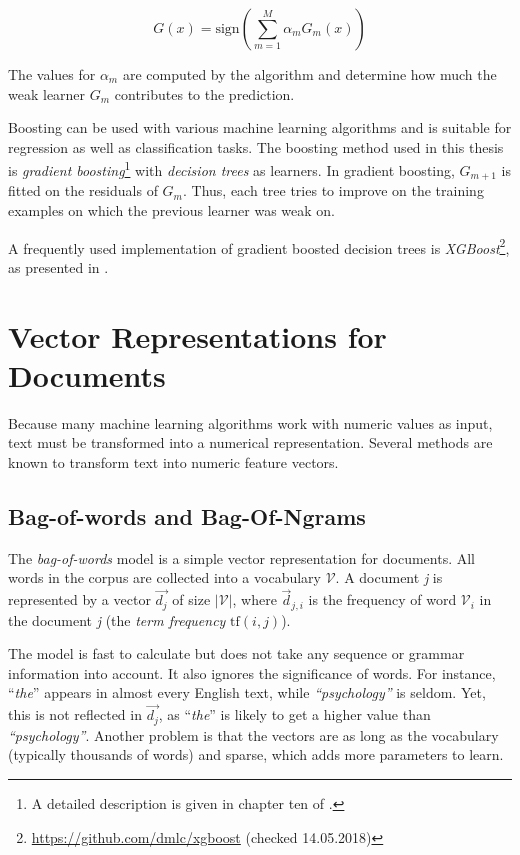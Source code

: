 \[G(x) = \text{sign}\left(\sum^M_{m=1} \alpha_m G_m(x)\right) \]

The values for $\alpha_m$ are computed by the algorithm and determine how much the weak learner \emph{$G_m$} contributes to the prediction.

Boosting can be used with various machine learning algorithms and is suitable for regression as well as classification tasks. The boosting method used in this thesis is \emph{gradient boosting}\footnote{A detailed description is given in chapter ten of \cite{friedman2001elements}.} with \emph{decision trees} as learners. In gradient boosting, \emph{$G_{m+1}$} is fitted on the residuals of \emph{$G_m$}. Thus, each tree tries to improve on the training examples on which the previous learner was weak on.

A frequently used implementation of gradient boosted decision trees is \emph{XGBoost}\footnote{\url{https://github.com/dmlc/xgboost} (checked 14.05.2018)}, as presented in \cite{DBLP:journals/corr/ChenG16}.



\section{Vector Representations for Documents}
Because many machine learning algorithms work with numeric values as input, text must be transformed into a numerical representation. Several methods are known to transform text into numeric feature vectors.
\subsection{Bag-of-words and Bag-Of-Ngrams}
The \emph{bag-of-words} model is a simple vector representation for documents. All words in the corpus are collected into a vocabulary $\mathcal{V}$. A document  \emph{j} is represented by a vector $\vec{d_j}$ of size $|\mathcal{V}|$, where $\vec{d}_{j,i}$ is the frequency of word $\mathcal{V}_i$ in the document \emph{j} (the \emph{term frequency} $\text{tf}(i,j)$).

The model is fast to calculate but does not take any sequence or grammar information into account. It also ignores the significance of words. For instance, \enquote{\emph{the}} appears in almost every English text, while \emph{\enquote{psychology}} is seldom. Yet, this is not reflected in $\vec{d_j}$, as \enquote{\emph{the}} is likely to get a higher value than \emph{\enquote{psychology}}. Another problem is that the vectors are as long as the vocabulary (typically thousands of words) and sparse, which adds more parameters to learn.

